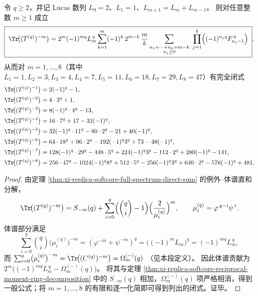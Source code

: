 \begin{theorem}\label{thm:xi-replica-softcore-full-trace-negative-power-lucas-finite-correction}
令 \(q\ge 2\)，并记 Lucas 数列 \(L_0=2\)、\(L_1=1\)、\(L_{m+1}=L_m+L_{m-1}\)。
则对任意整数 \(m\ge 1\) 成立
\[
\boxed{\;
\Tr\!\bigl((T^{(q)})^{-m}\bigr)
=2^m(-1)^{mq}L_m^{\,q}
\sum_{k=1}^{m}(-1)^k\,2^{m-k}\,\frac{m}{k}
\sum_{\substack{n_1+\cdots+n_k=m-k\\ n_j\ge 0}}
\ \prod_{j=1}^{k}\Bigl((-1)^{n_jq}F_{n_j-1}^{\,q}\Bigr)\; }.
\]
从而对 \(m=1,\dots,8\)（其中 \(L_1=1,L_2=3,L_3=4,L_4=7,L_5=11,L_6=18,L_7=29,L_8=47\)）有完全闭式
\[
\begin{aligned}
\Tr\!\bigl((T^{(q)})^{-1}\bigr)&=2(-1)^q-1,\\
\Tr\!\bigl((T^{(q)})^{-2}\bigr)&=4\cdot 3^q+1,\\
\Tr\!\bigl((T^{(q)})^{-3}\bigr)&=8(-1)^q\cdot 4^q-13,\\
\Tr\!\bigl((T^{(q)})^{-4}\bigr)&=16\cdot 7^q+17-32(-1)^q,\\
\Tr\!\bigl((T^{(q)})^{-5}\bigr)&=32(-1)^q\cdot 11^q-80\cdot 2^q-21+40(-1)^q,\\
\Tr\!\bigl((T^{(q)})^{-6}\bigr)&=64\cdot 18^q+96\cdot 2^q-192(-1)^q 3^q+73-48(-1)^q,\\
\Tr\!\bigl((T^{(q)})^{-7}\bigr)&=128(-1)^q\cdot 29^q-448\cdot 5^q+224(-1)^q 3^q-112\cdot 2^q+280(-1)^q-141,\\
\Tr\!\bigl((T^{(q)})^{-8}\bigr)&=256\cdot 47^q-1024(-1)^q 8^q+512\cdot 5^q-256(-1)^q 3^q+640\cdot 2^q-576(-1)^q+481.
\end{aligned}
\]
\end{theorem}
\begin{proof}
由定理 \ref{thm:xi-replica-softcore-full-spectrum-direct-sum} 的例外--体谱直和分解，
\[
\Tr\!\bigl((T^{(q)})^{-m}\bigr)
=S_{-m}(q)+\sum_{i=0}^{q}\Bigl(\binom{q}{i}-1\Bigr)\Bigl(\frac{2}{\mu_i^{(q)}}\Bigr)^{m},
\qquad
\mu_i^{(q)}=\varphi^{\,q-i}\psi^{\,i}.
\]
体谱部分满足
\[
\sum_{i=0}^{q}\binom{q}{i}\bigl(\mu_i^{(q)}\bigr)^{-m}
=(\varphi^{-m}+\psi^{-m})^q
=\bigl((-1)^mL_m\bigr)^q
=(-1)^{mq}L_m^{\,q},
\]
而
\(
\sum_{i=0}^{q}\bigl(\mu_i^{(q)}\bigr)^{-m}
=\Tr\!\bigl((C^{(q)})^{-m}\bigr)=\Omega_m^{(-)}(q)
\)
（见本段定义）。
因此体谱贡献为
\(
2^m\bigl((-1)^{mq}L_m^{\,q}-\Omega_m^{(-)}(q)\bigr)
\)。
将其与定理 \ref{thm:xi-replica-softcore-reciprocal-moment-ring-decomposition} 中的 \(S_{-m}(q)\) 相加，\(\Omega_m^{(-)}(q)\) 项严格相消，得到一般公式；将 \(m=1,\dots,8\) 的有限和逐一化简即可得到列出的闭式。证毕。
\end{proof}

